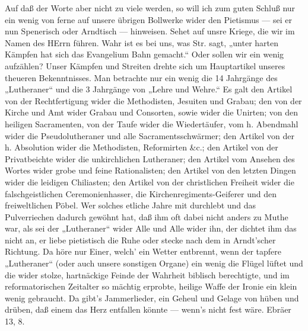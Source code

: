 Auf daß der Worte aber nicht zu viele werden, so will ich zum guten Schluß nur ein wenig von ferne auf unsere
übrigen Bollwerke wider den Pietismus — sei er nun Spenerisch oder Arndtisch — hinweisen. Sehet auf unsre
Kriege, die wir im Namen des HErrn führen. Wahr ist es bei uns, was Str. sagt, „unter harten Kämpfen hat sich
das Evangelium Bahn gemacht.“ Oder sollen wir ein wenig aufzählen? Unser Kämpfen und Streiten drehte sich um
Hauptartikel unseres theueren Bekenntnisses. Man betrachte nur ein wenig die 14 Jahrgänge des „Lutheraner“
und die 3 Jahrgänge von „Lehre und Wehre.“ Es galt den Artikel von der Rechtfertigung wider die Methodisten,
Jesuiten und Grabau; den von der Kirche und Amt
wider Grabau und Consorten, sowie wider die Unirten; von den heiligen Sacramenten, von der Taufe wider die
Wiedertäufer, vom h. Abendmahl wider die Pseudolutheraner und alle Sacramentsschwärmer; den Artikel von der
h. Absolution wider die Methodisten, Reformirten \&c.; den Artikel von der Privatbeichte wider die unkirchlichen
Lutheraner; den Artikel vom Ansehen des Wortes wider grobe und feine Rationalisten; den Artikel von den letzten
Dingen wider die leidigen Chiliasten; den Artikel von der christlichen Freiheit wider die falschgeistlichen
Ceremonienhasser, die Kirchenregiments-Geiferer und den freiweltlichen Pöbel. Wer solches etliche Jahre mit
durchlebt und das Pulverriechen dadurch gewöhnt hat, daß ihm oft dabei nicht anders zu Muthe war, als sei der
„Lutheraner“ wider Alle und Alle wider ihn, der dichtet ihm das nicht an, er liebe pietistisch die Ruhe
oder stecke nach dem in Arndt’scher Richtung. Da höre nur Einer, welch’ ein Wetter entbrennt, wenn der
tapfere „Lutheraner“ (oder auch unsere sonstigen Organe) ein wenig die Flügel lüftet und die wider stolze,
hartnäckige Feinde der Wahrheit biblisch berechtigte, und im reformatorischen Zeitalter so mächtig erprobte,
heilige Waffe der Ironie ein klein wenig gebraucht. Da gibt’s Jammerlieder, ein Geheul und Gelage von hüben
und drüben, daß einem das Herz entfallen könnte — wenn’s nicht fest wäre. Ebräer 13, 8.

